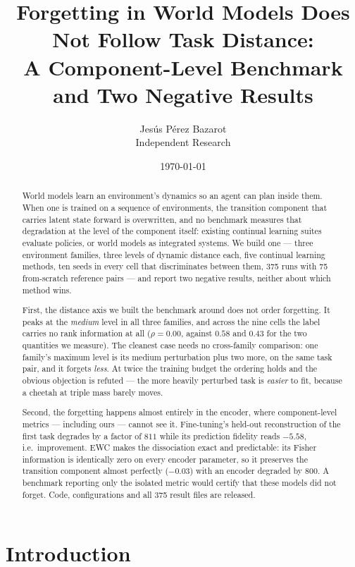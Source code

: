 \documentclass[11pt]{article}
\title{Forgetting in World Models Does Not Follow Task Distance:\\
       \large A Component-Level Benchmark and Two Negative Results}
\author{Jes\'us P\'erez Bazarot\\ Independent Research}
\date{\today}
\begin{document}
\maketitle

\begin{abstract}
World models learn an environment's dynamics so an agent can plan inside them.
When one is trained on a sequence of environments, the transition component
that carries latent state forward is overwritten, and no benchmark measures
that degradation at the level of the component itself: existing continual
learning suites evaluate policies, or world models as integrated systems. We
build one --- three environment families, three levels of dynamic distance
each, five continual learning methods, ten seeds in every cell that
discriminates between them, 375 runs with 75 from-scratch reference pairs ---
and report two negative results, neither about which method wins.

First, the distance axis we built the benchmark around does not order
forgetting. It peaks at the \emph{medium} level in all three families, and
across the nine cells the label carries no rank information at all
($\rho = 0.00$, against $0.58$ and $0.43$ for the two quantities we measure).
The cleanest case needs no cross-family comparison: one family's maximum level
is its medium perturbation plus two more, on the same task pair, and it forgets
\emph{less}. At twice the training budget the ordering holds and the obvious
objection is refuted --- the more heavily perturbed task is \emph{easier} to
fit, because a cheetah at triple mass barely moves.

Second, the forgetting happens almost entirely in the encoder, where
component-level metrics --- including ours --- cannot see it. Fine-tuning's
held-out reconstruction of the first task degrades by a factor of $811$ while
its prediction fidelity reads $-5.58$, i.e.\ improvement. EWC makes the
dissociation exact and predictable: its Fisher information is identically zero
on every encoder parameter, so it preserves the transition component almost
perfectly ($-0.03$) with an encoder degraded by $800$. A benchmark reporting
only the isolated metric would certify that these models did not forget.
Code, configurations and all 375 result files are released.
\end{abstract}

\section{Introduction}
\label{sec:intro}
\end{document}
